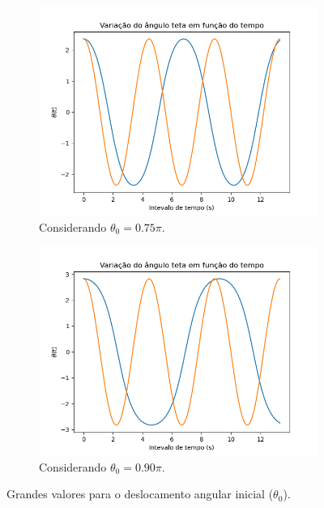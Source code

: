 \documentclass[12pt,openright,twoside,english,brazil]{abntex2}
\begin{document}
\begin{figure}[h]
 \centering
 \begin{subfigure}{.5\textwidth}
  \centering
  \includegraphics[width=1.1\linewidth]{teta-0-75pi.png}
  \caption{Considerando $\theta_0=0.75\pi$.}
 \end{subfigure}%
 \begin{subfigure}{.5\textwidth}
  \centering
  \includegraphics[width=1.1\linewidth]{teta-0-90pi.png}
  \caption{Considerando $\theta_0=0.90\pi$.}
 \end{subfigure}
 \caption{Grandes valores para o deslocamento angular inicial ($\theta_0$).}
 \label{Figura7}
\end{figure}
\end{document}

